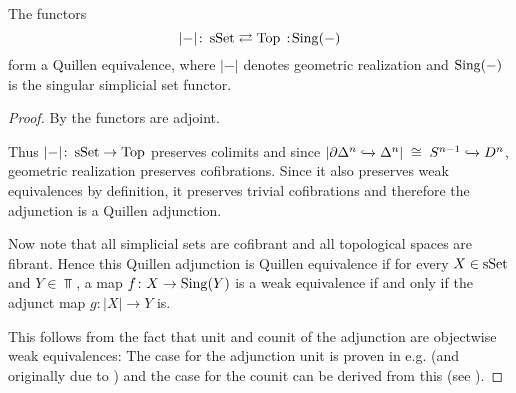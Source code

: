 \begin{thm}\label{prop:quillenEqSSetTop}
    The functors
    \begin{equation*}
        \lvert-\rvert\colon\sSet\rightleftarrows\Top\mkern+3mu:\mkern-3mu\Sing(-)
    \end{equation*}
    form a Quillen equivalence, where $\lvert-\rvert$ denotes geometric realization and $\operatorname{Sing}(-)$ is the singular simplicial set functor.
    \begin{proof}
        By \cite[Corollary 1.1.8.5]{kerodon} the functors are adjoint.

        Thus $\lvert-\rvert\colon\operatorname{sSet}\to\operatorname{Top}$ preserves colimits and since $\lvert\partial\Delta^n\xhookrightarrow{}\Delta^n\rvert\;\cong\;S^{n-1}\xhookrightarrow{} D^n$, geometric realization preserves cofibrations.
        Since it also preserves weak equivalences by definition, it preserves trivial cofibrations and therefore the adjunction is a Quillen adjunction.

        Now note that all simplicial sets are cofibrant and all topological spaces are fibrant.
        Hence this Quillen adjunction is Quillen equivalence if for every $X\in\operatorname{sSet}$ and $Y\in\Top$, a map $f\colon X\to\operatorname{Sing}(Y)$ is a weak equivalence if and only if the adjunct map $g\colon\lvert X\rvert\to Y$ is.
        
        This follows from the fact that unit and counit of the adjunction are objectwise weak equivalences:
        The case for the adjunction unit is proven in e.g. \cite[Theorem 3.5.4.1]{kerodon} (and originally due to \cite{milnor_unit_we}) and the case for the counit can be derived from this (see \cite[Corollary 3.5.4.2]{kerodon}).
    \end{proof}
\end{thm}
